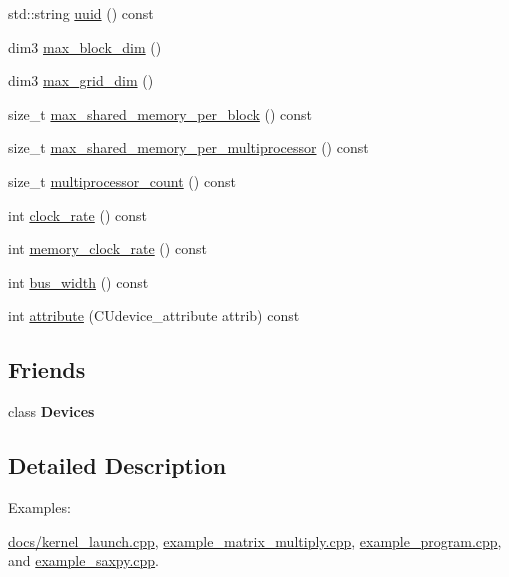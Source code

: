 \begin{DoxyCompactItemize}
std\+::string \hyperlink{classyacx_1_1_device_a1fcf245197f59b939e36c24771ee07d3}{uuid} () const
\item 
dim3 \hyperlink{classyacx_1_1_device_a34e5cca7423047044ac3e683bf0eb2f9}{max\+\_\+block\+\_\+dim} ()
\item 
dim3 \hyperlink{classyacx_1_1_device_a28355cb20ff6755dd958082540013600}{max\+\_\+grid\+\_\+dim} ()
\item 
size\+\_\+t \hyperlink{classyacx_1_1_device_a76378cc2e3f33e4c714296843236be4b}{max\+\_\+shared\+\_\+memory\+\_\+per\+\_\+block} () const
\item 
size\+\_\+t \hyperlink{classyacx_1_1_device_ac1dcf4a775430a5334eb5c51586a69a2}{max\+\_\+shared\+\_\+memory\+\_\+per\+\_\+multiprocessor} () const
\item 
size\+\_\+t \hyperlink{classyacx_1_1_device_ae97aae54e13c2be6acbb1d0992ddd473}{multiprocessor\+\_\+count} () const
\item 
int \hyperlink{classyacx_1_1_device_a74c7ad2bea44bf536f35c79b9f19528a}{clock\+\_\+rate} () const
\item 
int \hyperlink{classyacx_1_1_device_a41a46878ca07cfbbfd553aeae6076e63}{memory\+\_\+clock\+\_\+rate} () const
\item 
int \hyperlink{classyacx_1_1_device_aaec2c2024842d546c46e7ab45abce8c5}{bus\+\_\+width} () const
\item 
int \hyperlink{classyacx_1_1_device_aff8748b38646df669d7b29d03dc18077}{attribute} (C\+Udevice\+\_\+attribute attrib) const
\end{DoxyCompactItemize}
\subsection*{Friends}
\begin{DoxyCompactItemize}
\item 
\mbox{\label{classyacx_1_1_device_a26656a71544c176b6a5f20be8773de3f}} 
class {\bfseries Devices}
\end{DoxyCompactItemize}


\subsection{Detailed Description}
\begin{Desc}
\item[Examples\+: ]\par
\hyperlink{docs_2kernel_launch_8cpp-example}{docs/kernel\+\_\+launch.\+cpp}, \hyperlink{example_matrix_multiply_8cpp-example}{example\+\_\+matrix\+\_\+multiply.\+cpp}, \hyperlink{example_program_8cpp-example}{example\+\_\+program.\+cpp}, and \hyperlink{example_saxpy_8cpp-example}{example\+\_\+saxpy.\+cpp}.\end{Desc}


